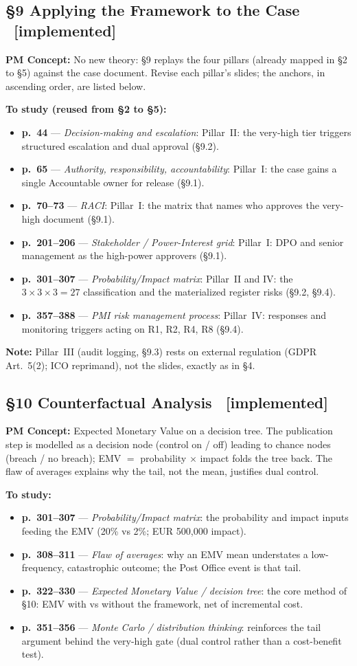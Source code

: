 \documentclass[12pt,a4paper]{article}
\newcommand{\statusdone}{\textcolor{donegreen}{\small\textbf{[implemented]}}}
\newcommand{\slide}[3]{\item \textbf{p.~#1} --- \textit{#2}: #3}
\newcommand{\concetto}[1]{\textbf{PM Concept:} #1\par\vspace{2pt}}
\begin{document}
\subsection{\S9 Applying the Framework to the Case \ \statusdone}
\concetto{No new theory: \S9 replays the four pillars (already mapped in \S2 to \S5) against the case document. Revise each pillar's slides; the anchors, in ascending order, are listed below.}
\textbf{To study (reused from \S2 to \S5):}
\begin{itemize}
  \slide{44}{Decision-making and escalation}{Pillar~II: the very-high tier triggers structured escalation and dual approval (\S9.2).}
  \slide{65}{Authority, responsibility, accountability}{Pillar~I: the case gains a single Accountable owner for release (\S9.1).}
  \slide{70--73}{RACI}{Pillar~I: the matrix that names who approves the very-high document (\S9.1).}
  \slide{201--206}{Stakeholder / Power-Interest grid}{Pillar~I: DPO and senior management as the high-power approvers (\S9.1).}
  \slide{301--307}{Probability/Impact matrix}{Pillar~II and IV: the $3\times3\times3=27$ classification and the materialized register risks (\S9.2, \S9.4).}
  \slide{357--388}{PMI risk management process}{Pillar~IV: responses and monitoring triggers acting on R1, R2, R4, R8 (\S9.4).}
\end{itemize}
\textbf{Note:} Pillar~III (audit logging, \S9.3) rests on external regulation (GDPR Art.~5(2); ICO reprimand), not the slides, exactly as in \S4.

\subsection{\S10 Counterfactual Analysis \ \statusdone}
\concetto{Expected Monetary Value on a decision tree. The publication step is modelled as a decision node (control on / off) leading to chance nodes (breach / no breach); EMV $=$ probability $\times$ impact folds the tree back. The flaw of averages explains why the tail, not the mean, justifies dual control.}
\textbf{To study:}
\begin{itemize}
  \slide{301--307}{Probability/Impact matrix}{the probability and impact inputs feeding the EMV (20\% vs 2\%; EUR 500,000 impact).}
  \slide{308--311}{Flaw of averages}{why an EMV mean understates a low-frequency, catastrophic outcome; the Post Office event is that tail.}
  \slide{322--330}{Expected Monetary Value / decision tree}{the core method of \S10: EMV with vs without the framework, net of incremental cost.}
  \slide{351--356}{Monte Carlo / distribution thinking}{reinforces the tail argument behind the very-high gate (dual control rather than a cost-benefit test).}
\end{itemize}
\end{document}
